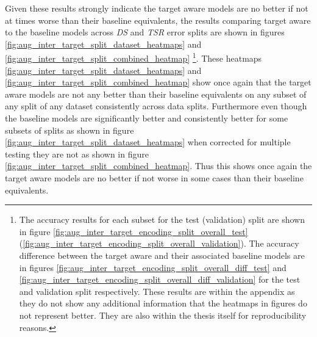 Given these results strongly indicate the target aware models are no better if not at times worse than their baseline equivalents, the results comparing target aware to the baseline models across \textit{DS} and \textit{TSR} error splits are shown in figures \ref{fig:aug_inter_target_split_dataset_heatmaps} and \ref{fig:aug_inter_target_split_combined_heatmap} \footnote{The accuracy results for each subset for the test (validation) split are shown in figure \ref{fig:aug_inter_target_encoding_split_overall_test} (\ref{fig:aug_inter_target_encoding_split_overall_validation}). The accuracy difference between the target aware and their associated baseline models are in figures \ref{fig:aug_inter_target_encoding_split_overall_diff_test} and \ref{fig:aug_inter_target_encoding_split_overall_diff_validation} for the test and validation split respectively. These results are within the appendix as they do not show any additional information that the heatmaps in figures do not represent better. They are also within the thesis itself for reproducibility reasons.}. These heatmaps \ref{fig:aug_inter_target_split_dataset_heatmaps} and \ref{fig:aug_inter_target_split_combined_heatmap} show once again that the target aware models are not any better than their baseline equivalents on any subset of any split of any dataset consistently across data splits. Furthermore even though the baseline models are significantly better and consistently better for some subsets of splits as shown in figure \ref{fig:aug_inter_target_split_dataset_heatmaps} when corrected for multiple testing they are not as shown in figure \ref{fig:aug_inter_target_split_combined_heatmap}. Thus this shows once again the target aware models are no better if not worse in some cases than their baseline equivalents.

